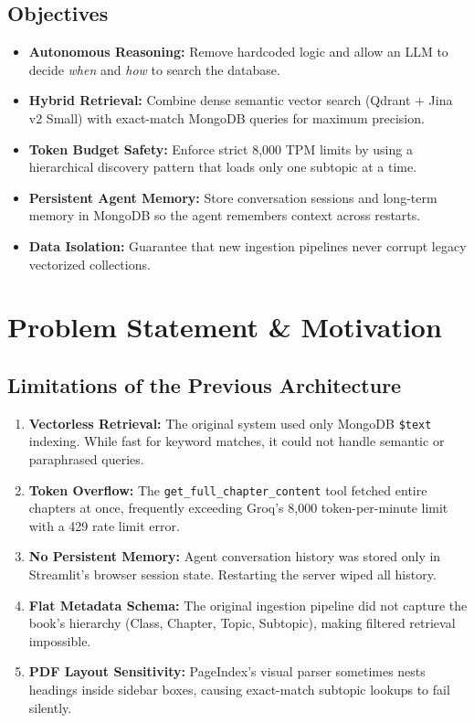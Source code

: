 \documentclass[12pt, a4paper]{article}
\begin{document}
\subsection{Objectives}
\begin{itemize}[label=\(\bullet\)]
    \item \textbf{Autonomous Reasoning:} Remove hardcoded logic and allow an LLM to decide \textit{when} and \textit{how} to search the database.
    \item \textbf{Hybrid Retrieval:} Combine dense semantic vector search (Qdrant + Jina v2 Small) with exact-match MongoDB queries for maximum precision.
    \item \textbf{Token Budget Safety:} Enforce strict 8,000 TPM limits by using a hierarchical discovery pattern that loads only one subtopic at a time.
    \item \textbf{Persistent Agent Memory:} Store conversation sessions and long-term memory in MongoDB so the agent remembers context across restarts.
    \item \textbf{Data Isolation:} Guarantee that new ingestion pipelines never corrupt legacy vectorized collections.
\end{itemize}

\newpage
\section{Problem Statement \& Motivation}
\subsection{Limitations of the Previous Architecture}
\begin{enumerate}
    \item \textbf{Vectorless Retrieval:} The original system used only MongoDB \texttt{\$text} indexing. While fast for keyword matches, it could not handle semantic or paraphrased queries.
    \item \textbf{Token Overflow:} The \texttt{get\_full\_chapter\_content} tool fetched entire chapters at once, frequently exceeding Groq's 8,000 token-per-minute limit with a 429 rate limit error.
    \item \textbf{No Persistent Memory:} Agent conversation history was stored only in Streamlit's browser session state. Restarting the server wiped all history.
    \item \textbf{Flat Metadata Schema:} The original ingestion pipeline did not capture the book's hierarchy (Class, Chapter, Topic, Subtopic), making filtered retrieval impossible.
    \item \textbf{PDF Layout Sensitivity:} PageIndex's visual parser sometimes nests headings inside sidebar boxes, causing exact-match subtopic lookups to fail silently.
\end{enumerate}
\end{document}
